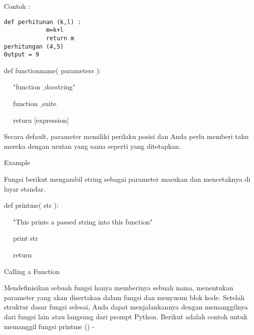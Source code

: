 Contoh : \par
\begin{verbatim}
def perhitunan (k,l) :
            m=k+l
            return m
perhitungan (4,5)
0utput = 9
\end{verbatim}

\noindent 
 \hspace*{0.5in} def functionname( parameters ): \par
\noindent 
~~  \hspace*{0.5in}  \hspace*{0.5in} "function $  \_  $docstring" \par
\noindent 
~~  \hspace*{0.5in}  \hspace*{0.5in} function $  \_  $suite \par
\noindent 
~~  \hspace*{0.5in}  \hspace*{0.5in} return [expression] \par
\noindent 
Secara default, parameter memiliki perilaku posisi dan Anda perlu memberi tahu mereka dengan urutan yang sama seperti yang ditetapkan. \par
\vspace{12pt}
\noindent 
Example \par
\noindent 
Fungsi berikut mengambil string sebagai parameter masukan dan mencetaknya di layar standar. \par
\noindent 
 \hspace*{0.5in} def printme( str ): \par
\noindent 
~~  \hspace*{0.5in}  \hspace*{0.5in} "This prints a passed string into this function" \par
\noindent 
~~  \hspace*{0.5in}  \hspace*{0.5in} print str \par
\noindent 
~~  \hspace*{0.5in}  \hspace*{0.5in} return \par
\vspace{12pt}
\noindent 
Calling a Function \par
\noindent 
Mendefinisikan sebuah fungsi hanya memberinya sebuah nama, menentukan parameter yang akan disertakan dalam fungsi dan menyusun blok kode. Setelah struktur dasar fungsi selesai, Anda dapat menjalankannya dengan memanggilnya dari fungsi lain atau langsung dari prompt Python. Berikut adalah contoh untuk memanggil fungsi printme () - \par
